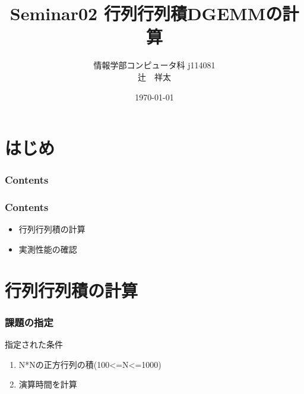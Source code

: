 \documentclass[dvipdfmx]{beamer}
\title[Seminar 2nd]{Seminar02 行列行列積DGEMMの計算}
\institute{Kogakuin University}
\author[Shota Tsuji]{情報学部コンピュータ科 j114081\\ 辻　祥太}
\date{\AdvanceDate[1]\today}
\begin{document}
\section*{はじめ}
\begin{frame}
  \titlepage \end{frame} 
\begin{frame}[plain]
  \frametitle{Contents}
  \tableofcontents
\end{frame}

\begin{frame}
  \frametitle{Contents}
  \begin{itemize}
    \item 行列行列積の計算
    \item 実測性能の確認
  \end{itemize}
\end{frame}

\section{行列行列積の計算}
\begin{frame}
  \frametitle{課題の指定}
  指定された条件
  \begin{enumerate}
		\item N*Nの正方行列の積(100<=N<=1000)
		\item 演算時間を計算
  \end{enumerate}
\end{frame}
\end{document}
